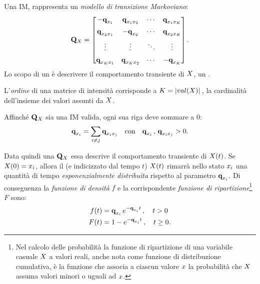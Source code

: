 \begin{definizione}[\upcase\im*{}]
\label{defn:im}
Una \acf{IM}, rappresenta un \emph{modello di transizione Markoviano}:
\[
\mathbf{Q}_{\mathnormal{X}}=
\begin{bmatrix}
    -\boldsymbol{\textbf{\text{q}}}_{\mathnormal{x}_1}            & \boldsymbol{\textbf{\text{q}}}_{\mathnormal{x}_1\mathnormal{x}_2}    & \cdots & \boldsymbol{\textbf{\text{q}}}_{\mathnormal{x}_1\mathnormal{x}_K}   \\[0.5em]
    \boldsymbol{\textbf{\text{q}}}_{\mathnormal{x}_2\mathnormal{x}_1}  & -\boldsymbol{\textbf{\text{q}}}_{\mathnormal{x}_2}              & \cdots & \boldsymbol{\textbf{\text{q}}}_{\mathnormal{x}_2\mathnormal{x}_K}   \\[0.5em]
    \vdots                              & \vdots                                & \ddots & \vdots                               \\[0.5em]
    \boldsymbol{\textbf{\text{q}}}_{\mathnormal{x}_K\mathnormal{x}_1}  & \boldsymbol{\textbf{\text{q}}}_{\mathnormal{x}_K\mathnormal{x}_2}    & \cdots & -\boldsymbol{\textbf{\text{q}}}_{\mathnormal{x}_K}
\end{bmatrix}\text{.}
\]
Lo scopo di un \im*{} è descrivere il comportamento transiente di $\mathnormal{X}$, un \mprocess*{} \omog*{}.
\end{definizione}
\begin{osservazione}
L'\emph{ordine} di una matrice di intensità corrisponde a $K=|val(\mathnormal{X})|\,$, la cardinalità dell'insieme dei valori assunti da $\mathnormal{X}$.
\end{osservazione}
Affinché $\mathbf{Q}_{\mathnormal{X}}$ sia una \acl{IM} valida, ogni sua riga deve sommare a $0$:
\[
\boldsymbol{\textbf{\text{q}}}_{\mathnormal{x}_i}=\sum_{i \neq j}\boldsymbol{\textbf{\text{q}}}_{\mathnormal{x}_i\mathnormal{x}_j}\quad\text{con}\quad \boldsymbol{\textbf{\text{q}}}_{\mathnormal{x}_i}\,,\,\boldsymbol{\textbf{\text{q}}}_{\mathnormal{x}_i\mathnormal{x}_j}>0\text{.}
\]

Data quindi una \im*{} $\mathbf{Q}_{\mathnormal{X}}$ essa descrive il comportamento transiente di $\mathnormal{X}(t)$. Se $\mathnormal{X}(0)=\mathnormal{x}_i$, allora il \mprocess*{} \omog*{} (e indicizzato dal tempo $t$) $\mathnormal{X}(t)$ rimarrà nello stato $\mathnormal{x}_i$ una quantità di tempo \emph{esponenzialmente distribuita} rispetto al parametro $\boldsymbol{\textbf{\text{q}}}_{\mathnormal{x}_i}$. Di conseguenza la \emph{funzione di densità} $f$ e la corrispondente \emph{funzione di ripartizione}\footnote{Nel calcolo delle probabilità la funzione di ripartizione di una variabile casuale $\mathnormal{X}$ a valori reali, anche nota come funzione di distribuzione cumulativa, è la funzione che associa a ciascun valore $\mathnormal{x}$ la probabilità che $\mathnormal{X}$ assuma valori minori o uguali ad $\mathnormal{x}$.} $F$ sono:
\begin{equation}
\label{eq:im-distrib}
\begin{split}
f(t) &= \boldsymbol{\textbf{\text{q}}}_{\mathnormal{x}_i}\,e^{-\boldsymbol{\textbf{\text{q}}}_{\mathnormal{x}_i}t}\,,\quad t>0 \\
F(t) &= 1-e^{-\boldsymbol{\textbf{\text{q}}}_{\mathnormal{x}_i}t}\,,\quad t\geq0\text{.}
\end{split}
\end{equation}

